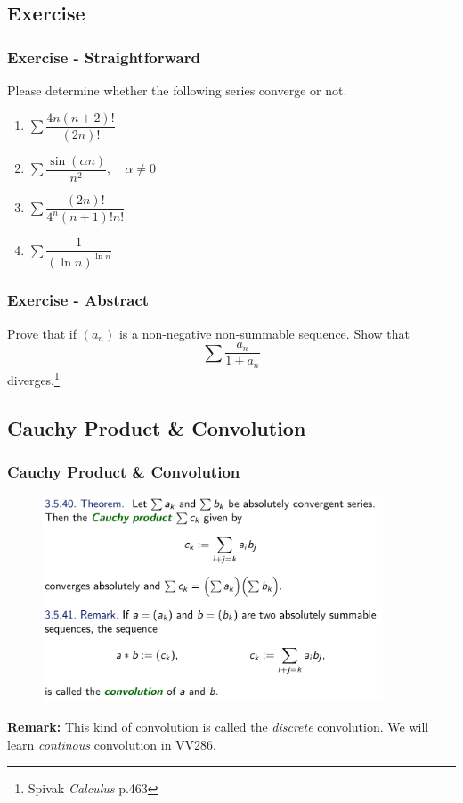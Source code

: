 \documentclass[10pt, t]{beamer}
\renewcommand{\emph}[1]{{\color{themecolor}\textsl{#1}}}
\begin{document}
\subsection{Exercise}
\begin{frame}
    \frametitle{Exercise - Straightforward}

    Please determine whether the following series converge or not.
    \begin{enumerate}
        \item $\sum\dfrac{4n(n+2)!}{(2n)!}$
        \item $\sum\dfrac{\sin(\alpha n)}{n^2},\quad \alpha\neq 0$
        \item $\sum \dfrac{(2n)!}{4^n(n+1)!n!}$
        \item $\sum \dfrac{1}{(\ln n)^{\ln n}}$
    \end{enumerate}
\end{frame}

\begin{frame}
    \frametitle{Exercise - Abstract}

    Prove that if $(a_n)$ is a non-negative non-summable sequence. Show that
    $$\sum\dfrac{a_n}{1+a_n}$$
    diverges.\footnote[frame]{Spivak \textit{Calculus} p.463}
\end{frame}
\subsection{Cauchy Product \& Convolution}
\begin{frame}
    \frametitle{Cauchy Product \& Convolution}

    \begin{figure}[H]
        \centering
        \includegraphics[width=0.9\textwidth]{2020-11-11-15-36-39.png}
    \end{figure}
    \textbf{Remark:} This kind of convolution is called the \emph{discrete} convolution. We will learn \emph{continous} convolution in VV286.

\end{frame}
\end{document}
